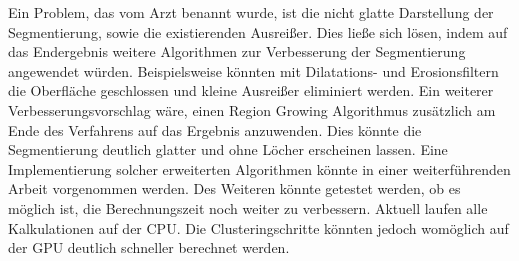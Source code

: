 Ein Problem, das vom Arzt benannt wurde, ist die nicht glatte Darstellung der Segmentierung, sowie die existierenden Ausreißer. Dies ließe sich lösen, indem auf das Endergebnis weitere Algorithmen zur Verbesserung der Segmentierung angewendet würden. Beispielsweise könnten mit Dilatations- und Erosionsfiltern die Oberfläche geschlossen und kleine Ausreißer eliminiert werden. Ein weiterer Verbesserungsvorschlag wäre, einen Region Growing Algorithmus zusätzlich am Ende des Verfahrens auf das Ergebnis anzuwenden. Dies könnte die Segmentierung deutlich glatter und ohne Löcher erscheinen lassen. Eine Implementierung solcher erweiterten Algorithmen könnte in einer weiterführenden Arbeit vorgenommen werden.
\newline
Des Weiteren könnte getestet werden, ob es möglich ist, die Berechnungszeit noch weiter zu verbessern. Aktuell laufen alle Kalkulationen auf der CPU. Die Clusteringschritte könnten jedoch womöglich auf der GPU deutlich schneller berechnet werden.


